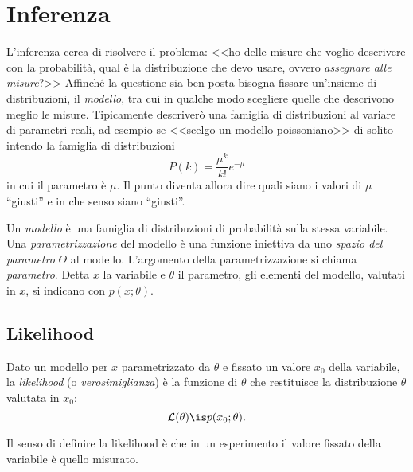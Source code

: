 \chapter{Inferenza}

L'inferenza cerca di risolvere il problema:
<<ho delle misure che voglio descrivere con la probabilità,
qual è la distribuzione che devo usare, ovvero \emph{assegnare alle misure}?>>
Affinché la questione sia ben posta bisogna fissare un'insieme di distribuzioni, il \emph{modello},
tra cui in qualche modo scegliere quelle che descrivono meglio le misure.
Tipicamente descriverò una famiglia di distribuzioni al variare di parametri reali,
ad esempio se <<scelgo un modello poissoniano>> di solito intendo la famiglia di distribuzioni
\begin{equation*}
	P(k) = \frac{\mu^k}{k!}e^{-\mu}
\end{equation*}
in cui il parametro è $\mu$.
Il punto diventa allora dire quali siano i valori di $\mu$ ``giusti'' e in che senso siano ``giusti''.

\begin{definition}[Modello]
	Un \emph{modello} è una famiglia di distribuzioni di probabilità sulla stessa variabile.
	Una \emph{parametrizzazione} del modello è una funzione iniettiva
	da uno \emph{spazio del parametro} $\Theta$
	al modello.
	L'argomento della parametrizzazione si chiama \emph{parametro}.
	Detta $x$ la variabile e $\theta$ il parametro,
	gli elementi del modello, valutati in $x$, si indicano con $p(x;\theta)$.
\end{definition}

\section{Likelihood}

\begin{definition}[Likelihood]
	Dato un modello per $x$ parametrizzato da $\theta$
	e fissato un valore $x_0$ della variabile,
	la \emph{likelihood} (o \emph{verosimiglianza}) è la funzione di $\theta$
	che restituisce la distribuzione $\theta$ valutata in $x_0$:
	\begin{equation*}
		\mathcal L(\theta) \is p(x_0;\theta).
	\end{equation*}
\end{definition}

Il senso di definire la likelihood
è che in un esperimento il valore fissato della variabile è quello misurato.

